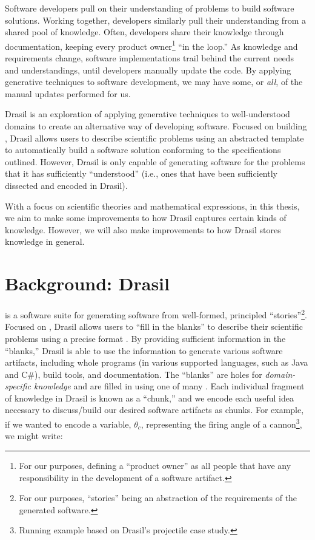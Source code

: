 Software developers pull on their understanding of problems to build software
solutions. Working together, developers similarly pull their understanding from
a shared pool of knowledge. Often, developers share their knowledge through
documentation, keeping every product owner\footnote{For our purposes, defining a
      ``product owner'' as all people that have any responsibility in the development
      of a software artifact.} ``in the loop.'' As knowledge and requirements change,
software implementations trail behind the current needs and understandings,
until developers manually update the code. By applying generative techniques to
software development, we may have some, or \textit{all}, of the manual updates
performed for us.

Drasil \cite{Drasil2021} is an exploration of applying generative techniques to
well-understood domains to create an alternative way of developing software.
Focused on building , Drasil allows users to describe scientific
problems using an abstracted  template to automatically build a
software solution conforming to the specifications outlined. However, Drasil is
only capable of generating software for the problems that it has sufficiently
``understood'' (i.e., ones that have been sufficiently dissected and encoded in
Drasil).

With a focus on scientific theories and mathematical expressions, in this
thesis, we aim to make some improvements to how Drasil captures certain kinds of
knowledge. However, we will also make improvements to how Drasil stores
knowledge in general.

\section{Background: Drasil}
\label{chap:introduction:sec:background}

 is a software suite
for generating software from well-formed, principled ``stories''\footnote{For
our purposes, ``stories'' being an abstraction of the requirements of the
generated software.}. Focused on , Drasil allows users to ``fill in the
blanks'' to describe their scientific problems using a precise  format
\cite{SmithAndLai2005}. By providing sufficient information in the ``blanks,''
Drasil is able to use the information to generate various software artifacts,
including whole programs (in various supported languages, such as Java and C\#),
build tools, and documentation. The ``blanks'' are holes for
\textit{domain-specific knowledge} and are filled in using one of many
. Each individual fragment of knowledge in Drasil is known as a
``chunk,'' and we encode each useful idea necessary to discuss/build our desired
software artifacts as chunks. For example, if we wanted to encode a variable,
\(\theta{}_{c}\), representing the firing angle of a cannon\footnote{Running
example based on Drasil's \acs{projectile} case study.}, we might write:

